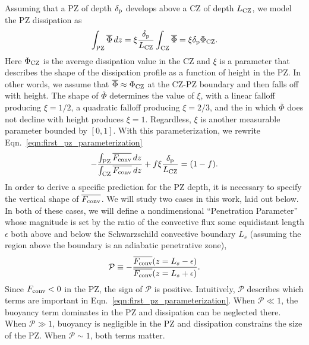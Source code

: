\documentclass{aastex631}
\newcommand{\delp}{\ensuremath{\delta_{\rm{p}}}}
\newcommand{\Fconv}{\ensuremath{F_{\rm{conv}}}}
\newcommand{\mP}{\ensuremath{\mathcal{P}}}
\renewcommand{\bar}[1]{\overline{#1}}
\begin{document}
Assuming that a PZ of depth $\delp$ develops above a CZ of depth $L_{\rm{CZ}}$, we model the PZ dissipation as
\begin{equation}
\int_{\rm{PZ}} \bar{\Phi}\,dz = \xi\frac{\delp}{L_{\rm{CZ}}}\int_{\rm{CZ}}\bar{\Phi} = \xi \delp \Phi_{\rm{CZ}}.
\label{eqn:xi_defn}
\end{equation}
Here $\Phi_{\rm{CZ}}$ is the average dissipation value in the CZ and $\xi$ is a parameter that describes the shape of the dissipation profile as a function of height in the PZ.
In other words, we assume that $\bar{\Phi} \approx \Phi_{\rm{CZ}}$ at the CZ-PZ boundary and then falls off with height.
The shape of $\bar{\Phi}$ determines the value of $\xi$, with a linear falloff producing $\xi = 1/2$, a quadratic falloff producing $\xi = 2/3$, and the in which $\bar{\Phi}$ does not decline with height produces $\xi = 1$.
Regardless, $\xi$ is another measurable parameter bounded by $[0, 1]$. 
With this parameterization, we rewrite Eqn.~\ref{eqn:first_pz_parameterization}
\begin{equation}
-\frac{\int_{\rm{PZ}}\bar{\Fconv}\,dz}{\int_{\rm{CZ}}\bar{\Fconv}\,dz} + f\xi\frac{\delp}{L_{\rm{CZ}}}
= (1 - f).
\label{eqn:theory_fraction}
\end{equation}
In order to derive a specific prediction for the PZ depth, it is necessary to specify the vertical shape of $\overline{\Fconv}$.
We will study two cases in this work, laid out below.
In both of these cases, we will define a nondimensional ``Penetration Parameter'' whose magnitude is set by the ratio of the convective flux some equidistant length $\epsilon$ both above and below the Schwarzschild convective boundary $L_s$ (assuming the region above the boundary is an adiabatic penetrative zone),
\begin{equation}
\mP \equiv -\frac{\overline{\Fconv}(z = L_s - \epsilon)}{\overline{\Fconv}(z = L_s + \epsilon)}.
\label{eqn:theory_P_defn}
\end{equation}
Since $\Fconv < 0$ in the PZ, the sign of $\mP$ is positive.
Intuitively, $\mP$ describes which terms are important in Eqn.~\ref{eqn:first_pz_parameterization}.
When $\mP \ll 1$, the buoyancy term dominates in the PZ and dissipation can be neglected there.
When $\mP \gg 1$, buoyancy is negligible in the PZ and dissipation constrains the size of the PZ.
When $\mP \sim 1$, both terms matter.
\end{document}
